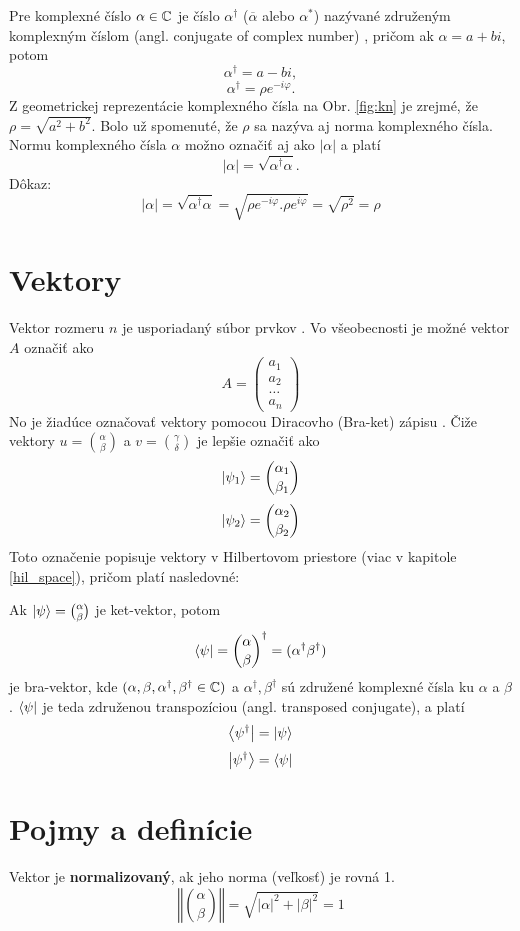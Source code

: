Pre komplexné číslo \(\alpha \in \mathbb{C}\) je číslo \(\alpha^{\dag}\) (\(\overline{\alpha}\) alebo \(\alpha^{*}\)) nazývané združeným komplexným číslom (angl. conjugate of complex number) \cite{Tit06}, pričom ak \(\alpha = a + bi\), potom 
\[\alpha^{\dag} = a - bi,\] 
\[\alpha^{\dag} = \rho e^{-i\varphi}.\]
Z geometrickej reprezentácie komplexného čísla na Obr. \ref{fig:kn} je zrejmé, že \(\rho = \sqrt{a^2 + b^2}\).
Bolo už spomenuté, že \(\rho\) sa nazýva aj norma komplexného čísla.
Normu komplexného čísla \(\alpha\) možno označiť aj ako \(|\alpha|\) a platí
\[|\alpha| = \sqrt{\alpha^{\dag}\alpha}.\]
Dôkaz:
\[|\alpha| = \sqrt{\alpha^{\dag}\alpha} = \sqrt{\rho e^{-i\varphi}.\rho e^{i\varphi}} = \sqrt{\rho^{2}} = \rho\]

\section{Vektory}
\label{vektory}

Vektor rozmeru \(n\) je usporiadaný súbor prvkov \cite{Ber18}.
Vo všeobecnosti je možné vektor \(A\) označiť ako 
\[A = \begin{pmatrix}
		a_{1} \\
		a_{2}\\
		\dots \\
		a_{n}
     \end{pmatrix}\]
No je žiadúce označovať vektory pomocou Diracovho (Bra-ket) zápisu \cite{Nie+00}.
Čiže vektory \(u = \binom{\alpha}{\beta}\) a \(v = \binom{\gamma}{\delta}\) je lepšie označiť ako 
\[\Ket{\psi_1} = \binom{\alpha_1}{\beta_1}\]
\[\Ket{\psi_2} = \binom{\alpha_2}{\beta_2}\]
Toto označenie popisuje vektory v Hilbertovom priestore (viac v kapitole \ref{hil_space}), pričom platí nasledovné:

Ak \(\Ket{\psi} = \binom{\alpha}{\beta}\) je ket-vektor, potom 
\[\Bra{\psi} = {\binom{\alpha}{\beta}}^{\dag} = (\alpha^{\dag} \beta^{\dag})\]
je  bra-vektor, kde \( ( \alpha, \beta, \alpha^{\dag}, \beta^{\dag} \in \mathbb{C} ) \) a \(\alpha^{\dag}, \beta^{\dag}\) sú združené komplexné čísla ku \(\alpha\) a \(\beta\).
\(\Bra{\psi}\) je teda združenou transpozíciou (angl. transposed conjugate), a platí
\[\Bra{\psi^{\dag}} = \Ket{\psi}\]
\[\Ket{\psi^{\dag}} = \Bra{\psi}\]


\section{Pojmy a definície}
Vektor je \textbf{normalizovaný}, ak jeho norma (veľkosť) je rovná 1.
\[\left\Vert \binom{\alpha}{\beta} \right\Vert = \sqrt{|\alpha|^2 + |\beta|^2}= 1\]

